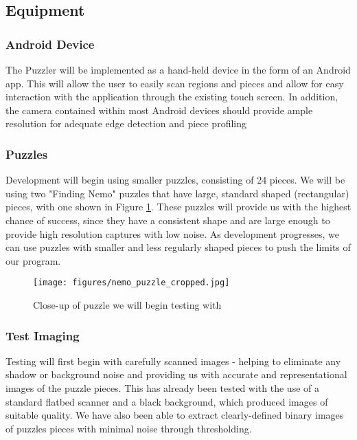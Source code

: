 \documentclass[12pt]{report}
\begin{document}
\subsection*{Equipment}

\subsubsection*{Android Device}
The Puzzler will be implemented as a hand-held device in the form of an Android app. This will allow the user to easily scan regions and pieces and allow for easy interaction with the application through the existing touch screen. In addition, the camera contained within most Android devices should provide ample resolution for adequate edge detection and piece profiling 

\subsubsection*{Puzzles}
Development will begin using smaller puzzles, consisting of 24 pieces. We will be using two "Finding Nemo" puzzles that have large, standard shaped (rectangular) pieces, with one shown in Figure \ref{fig:finding_nemo}. These puzzles will provide us with the highest chance of success, since they have a consistent shape and are large enough to provide high resolution captures with low noise. As development progresses, we can use puzzles with smaller and less regularly shaped pieces to push the limits of our program.

\begin{figure}[h]
\centering
\texttt{[image: figures/nemo\_puzzle\_cropped.jpg]}
\caption{Close-up of puzzle we will begin testing with}
\label{fig:finding_nemo}
\end{figure}

\subsubsection*{Test Imaging}
Testing will first begin with carefully scanned images - helping to eliminate any shadow or background noise and providing us with accurate and representational images of the puzzle pieces. This has already been tested with the use of a standard flatbed scanner and a black background, which produced images of suitable quality. We have also been able to extract clearly-defined binary images of puzzles pieces with minimal noise through thresholding.
\end{document}
